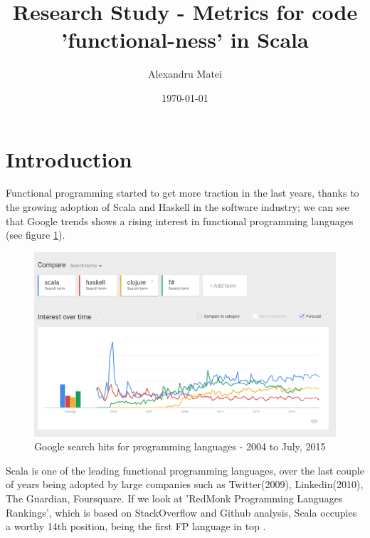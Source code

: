 \documentclass{article}
\title{Research Study - Metrics for code 'functional-ness' in Scala }
\date{\today}
\author{Alexandru Matei}
\begin{document}
\maketitle
\newpage

\section{Introduction}
Functional programming started to get more traction in the last years, thanks to the growing adoption of Scala and Haskell in the software industry; we can see that Google trends shows a rising interest in functional programming languages (see figure \ref{fig:google-rank}). \par

\begin{figure}[h!]
  \includegraphics[width=\linewidth]{google-trends.png}
  \caption{Google search hits for programming languages - 2004 to July, 2015 }
  \label{fig:google-rank}
\end{figure}

Scala is one of the leading functional programming languages, over the last couple of years being adopted by large companies such as  Twitter(2009), Linkedin(2010), The Guardian, Foursquare. If we look at 'RedMonk Programming Languages Rankings'\cite{redmonk:1}, which is based on StackOverflow and Github analysis,  Scala occupies a worthy 14th position, being the first FP language in top . \par
\end{document}
